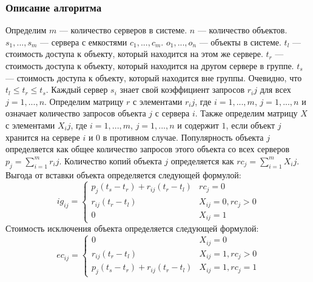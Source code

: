 		\subsubsection{Описание алгоритма}
			Определим $m$ --- количество серверов в системе. $n$ --- количество объектов. $s_1, ..., s_m$ --- сервера с емкостями
			$c_1, ..., c_m$. $o_1, ..., o_n$ --- объекты в системе. $t_l$ --- стоимость доступа к объекту, который находится на 
			этом же сервере. $t_r$ --- стоимость доступа к объекту, который находится на другом сервере в группе. $t_s$ --- стоимость 
			доступа к объекту, который находится вне группы. Очевидно, что $t_l \leq t_r \leq t_s$. Каждый сервер $s_i$ знает свой
			коэффициент запросов $r_ij$ для всех $j = 1, ..., n$. Определим матрицу $r$ с элементами $r_ij$, где $i = 1, ..., m$,
			$j = 1, ..., n$ и означает количество запросов объекта $j$ с сервера $i$. Также определим матрицу $X$ с элементами 
			$X_ij$, где $i = 1, ..., m$, $j = 1, ..., n$ и содержит $1$, если объект $j$ хранится на сервере $i$ и $0$  в противном случае.
			Популярность объекта $j$ определяется как общее количество запросов этого объекта со всех серверов $p_j = \sum_{i=1}^{m} r_ij$.
			Количество копий объекта $j$ определяется как $rc_j = \sum_{i=1}^{m} X_ij$.
			Выгода от вставки объекта определяется следующей формулой: 
			 \[ 	
				ig_{ij} =
				\begin{cases} 
			 		p_j (t_s - t_r) + r_{ij} (t_r - t_l) 	& rc_j = 0 \\
			 		r_{ij} (t_r - t_l) 						& X_{ij} = 0, rc_j > 0 \\
			 		0 										    & X_{ij} = 1 
			  	\end{cases}
			 \]
			Стоимость исключения объекта определяется следующей формулой:
			\[ 	
				ec_{ij} =
				\begin{cases} 
					0										& X_{ij} = 0 \\
					r_{ij} (t_r - t_l) 						& X_{ij} = 1, rc_j > 0 \\
					p_j (t_s - t_r) + r_{ij} (t_r - t_l)	& X_{ij} = 1, rc_j = 1 
			 	\end{cases}
			\]



